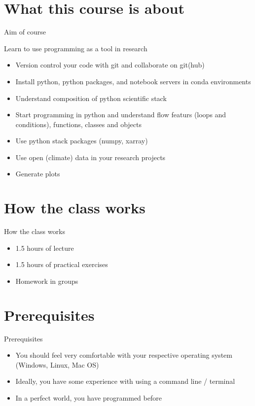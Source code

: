 \documentclass[10pt,color=usenames,dvipsnames]{beamer}
\begin{document}
\section{What this course is about}

\begin{frame}{Aim of course}
	
	Learn to use programming as a tool in research
	
	\begin{itemize}
		\item Version control your code with git and collaborate on git(hub)
		\item Install python, python packages, and notebook servers in conda environments
		\item Understand composition of python scientific stack
		\item Start programming in python and understand flow featurs (loops and conditions), functions, classes and objects
		\item Use python stack packages (numpy, xarray)
		\item Use open (climate) data in your research projects
		\item Generate plots
	\end{itemize}
	
\end{frame}

\section{How the class works}

\begin{frame}{How the class works}
	
	\begin{itemize}
		\item 1.5 hours of lecture
		\item 1.5 hours of practical exercises
		\item Homework in groups
	\end{itemize}	

\end{frame}

\section{Prerequisites}

\begin{frame}{Prerequisites}
	
	\begin{itemize}
		\item You should feel very comfortable with your respective operating system (Windows, Linux, Mac OS)
		\item Ideally, you have some experience with using a command line / terminal
		\item In a perfect world, you have programmed before
	\end{itemize}
	
\end{frame}
\end{document}
